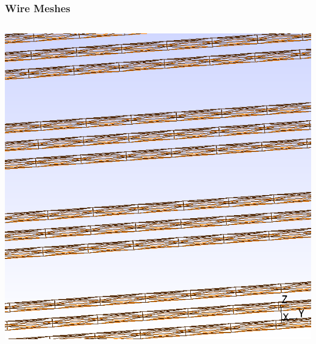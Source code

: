 \documentclass[xcolor=dvipsnames]{beamer}
\begin{document}
\begin{frame}
  \frametitle{Wire Meshes}

  \footnotesize

  \begin{columns}
    \begin{column}{0.3\textwidth}
      \begin{center}
        \includegraphics[height=0.4\textheight]{parallel-mesh.png}      
        

\end{center}
\end{column}
\end{columns}
\end{frame}
\end{document}
